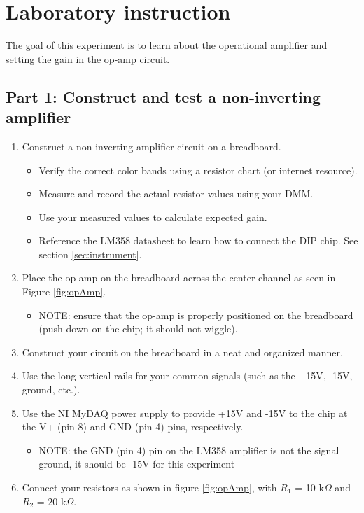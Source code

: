 \documentclass{article} %
\begin{document}
\section{Laboratory instruction}
The goal of this experiment is to learn about the operational amplifier and setting the gain in the op-amp circuit.

\subsection{Part 1: Construct and test a non-inverting amplifier}
\begin{enumerate}
    \item Construct a non-inverting amplifier circuit on a breadboard.
    \begin{itemize}
        \item Verify the correct color bands using a resistor chart (or internet resource).
        \item Measure and record the actual resistor values using your DMM.
        \item Use your measured values to calculate expected gain.
        \item Reference the LM358 datasheet to learn how to connect the DIP chip. See section \ref{sec:instrument}.
    \end{itemize}
    \item Place the op-amp on the breadboard across the center channel as seen in Figure \ref{fig:opAmp}.
    \begin{itemize}
        \item NOTE: ensure that the op-amp is properly positioned on the breadboard (push down on the chip; it should not wiggle).
    \end{itemize}
    \item Construct your circuit on the breadboard in a neat and organized manner. 
    \item Use the long vertical rails for your common signals (such as the +15V, -15V, ground, etc.).
    \item Use the NI MyDAQ power supply to provide +15V and -15V to the chip at the V+ (pin 8) and GND (pin 4) pins, respectively. 
    \begin{itemize}
        \item NOTE: the GND (pin 4) pin on the LM358 amplifier is not the signal ground, it should be -15V for this experiment
    \end{itemize}
    \item Connect your resistors as shown in figure \ref{fig:opAmp}, with $R_1$ = 10 k$\Omega$ and $R_2$ = 20 k$\Omega$.

\end{enumerate}
\end{document}
